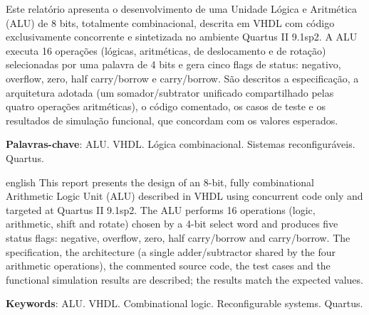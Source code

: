 \begin{resumo}
Este relatório apresenta o desenvolvimento de uma Unidade Lógica e Aritmética (ALU) de 8 bits, totalmente combinacional, descrita em VHDL com código exclusivamente concorrente e sintetizada no ambiente Quartus II 9.1sp2. A ALU executa 16 operações (lógicas, aritméticas, de deslocamento e de rotação) selecionadas por uma palavra de 4 bits e gera cinco flags de status: negativo, overflow, zero, half carry/borrow e carry/borrow. São descritos a especificação, a arquitetura adotada (um somador/subtrator unificado compartilhado pelas quatro operações aritméticas), o código comentado, os casos de teste e os resultados de simulação funcional, que concordam com os valores esperados.

\textbf{Palavras-chave}: ALU. VHDL. Lógica combinacional. Sistemas reconfiguráveis. Quartus.
\end{resumo}

\begin{resumo}[Abstract]
\begin{otherlanguage*}{english}
This report presents the design of an 8-bit, fully combinational Arithmetic Logic Unit (ALU) described in VHDL using concurrent code only and targeted at Quartus II 9.1sp2. The ALU performs 16 operations (logic, arithmetic, shift and rotate) chosen by a 4-bit select word and produces five status flags: negative, overflow, zero, half carry/borrow and carry/borrow. The specification, the architecture (a single adder/subtractor shared by the four arithmetic operations), the commented source code, the test cases and the functional simulation results are described; the results match the expected values.

\vspace{\onelineskip}
\noindent\textbf{Keywords}: ALU. VHDL. Combinational logic. Reconfigurable systems. Quartus.
\end{otherlanguage*}
\end{resumo}

